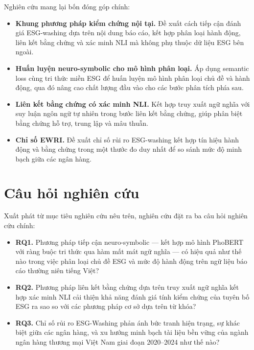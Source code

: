 Nghiên cứu mang lại bốn đóng góp chính:
\begin{itemize}
    \item \textbf{Khung phương pháp kiểm chứng nội tại.} Đề xuất cách tiếp cận đánh giá ESG-washing dựa trên nội dung báo cáo, kết hợp phân loại hành động, liên kết bằng chứng và xác minh NLI mà không phụ thuộc dữ liệu ESG bên ngoài.
    \item \textbf{Huấn luyện neuro-symbolic cho mô hình phân loại.} Áp dụng semantic loss cùng tri thức miền ESG để huấn luyện mô hình phân loại chủ đề và hành động, qua đó nâng cao chất lượng đầu vào cho các bước phân tích phía sau.
    \item \textbf{Liên kết bằng chứng có xác minh NLI.} Kết hợp truy xuất ngữ nghĩa với suy luận ngôn ngữ tự nhiên trong bước liên kết bằng chứng, giúp phân biệt bằng chứng hỗ trợ, trung lập và mâu thuẫn.
    \item \textbf{Chỉ số EWRI.} Đề xuất chỉ số rủi ro ESG-washing kết hợp tín hiệu hành động và bằng chứng trong một thước đo duy nhất để so sánh mức độ minh bạch giữa các ngân hàng.
\end{itemize}


\section{Câu hỏi nghiên cứu}
Xuất phát từ mục tiêu nghiên cứu nêu trên, nghiên cứu đặt ra ba câu hỏi nghiên cứu chính:
\begin{itemize}
    \item \textbf{RQ1.} Phương pháp tiếp cận neuro-symbolic --- kết hợp mô hình PhoBERT với ràng buộc tri thức qua hàm mất mát ngữ nghĩa --- có hiệu quả như thế nào trong việc phân loại chủ đề ESG và mức độ hành động trên ngữ liệu báo cáo thường niên tiếng Việt?

    \item \textbf{RQ2.} Phương pháp liên kết bằng chứng dựa trên truy xuất ngữ nghĩa kết hợp xác minh NLI cải thiện khả năng đánh giá tính kiểm chứng của tuyên bố ESG ra sao so với các phương pháp cơ sở dựa trên từ khóa?

    \item \textbf{RQ3.} Chỉ số rủi ro ESG-Washing phản ánh bức tranh hiện trạng, sự khác biệt giữa các ngân hàng, và xu hướng minh bạch tài liệu bền vững của ngành ngân hàng thương mại Việt Nam giai đoạn 2020--2024 như thế nào?
\end{itemize}

